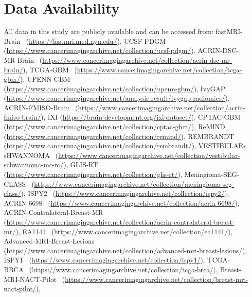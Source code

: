 \section{Data Availability}
All data in this study are publicly available and can be accessed from: 
fastMRI-Brain~\cite{knoll2020fastmri,zbontar2018fastmri} (\url{https://fastmri.med.nyu.edu/}),
UCSF-PDGM~\cite{calabrese2022university} (\url{https://www.cancerimagingarchive.net/collection/ucsf-pdgm/}),
ACRIN-DSC-MR-Brain~\cite{kinahan2019data} (\url{https://www.cancerimagingarchive.net/collection/acrin-dsc-mr-brain/}),
TCGA-GBM~\cite{scarpace2016cancer} (\url{https://www.cancerimagingarchive.net/collection/tcga-gbm/}),
UPENN-GBM~\cite{bakas2021multi} (\url{https://www.cancerimagingarchive.net/collection/upenn-gbm/}),
IvyGAP~\cite{pati2020multi} (\url{https://www.cancerimagingarchive.net/analysis-result/ivygap-radiomics/}),
ACRIN-FMISO-Brain~\cite{kinahan2018data} (\url{https://www.cancerimagingarchive.net/collection/acrin-fmiso-brain/}),
IXI (\url{https://brain-development.org/ixi-dataset/}),
CPTAC-GBM~\cite{CPTACGBM2018} (\url{https://www.cancerimagingarchive.net/collection/cptac-gbm/}),
ReMIND~\cite{juvekar2023brain} (\url{https://www.cancerimagingarchive.net/collection/remind/}),
REMBRANDT~\cite{scarpace2019data} (\url{https://www.cancerimagingarchive.net/collection/rembrandt/}),
VESTIBULAR-sHWANNOMA~\cite{Kujawa2023_Vestibular_Schwannoma} (\url{https://www.cancerimagingarchive.net/collection/vestibular-schwannoma-mc-rc/}),
GLIS-RT~\cite{shusharina2021glioma} (\url{https://www.cancerimagingarchive.net/collection/glis-rt/}),
Meningioma-SEG-CLASS~\cite{vassantachart2023segmentation} (\url{https://www.cancerimagingarchive.net/collection/meningioma-seg-class/}),
ISPY2~\cite{newitt2021acrin,Li2022_ISPY2} (\url{https://www.cancerimagingarchive.net/collection/ispy2/}),
ACRIN-6698~\cite{newitt2021acrin} (\url{https://www.cancerimagingarchive.net/collection/acrin-6698/}),
ACRIN-Contralateral-Breast-MR~\cite{Kinahan2021} (\url{https://www.cancerimagingarchive.net/collection/acrin-contralateral-breast-mr/}),
EA1141~\cite{comstock2023abbreviated} (\url{https://www.cancerimagingarchive.net/collection/ea1141/}),
Advanced-MRI-Breast-Lesions~\cite{Daniels2024} (\url{https://www.cancerimagingarchive.net/collection/advanced-mri-breast-lesions/}),
ISPY1~\cite{newitt2016multi} (\url{https://www.cancerimagingarchive.net/collection/ispy1/}),
TCGA-BRCA~\cite{lingle2016cancer} (\url{https://www.cancerimagingarchive.net/collection/tcga-brca/}),
Breast-MRI-NACT-Pilot~\cite{newitt2016single} (\url{https://www.cancerimagingarchive.net/collection/breast-mri-nact-pilot/}),
